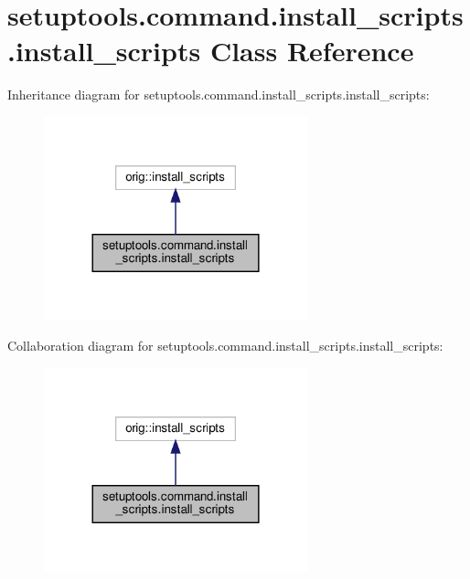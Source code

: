 \hypertarget{classsetuptools_1_1command_1_1install__scripts_1_1install__scripts}{}\section{setuptools.\+command.\+install\+\_\+scripts.\+install\+\_\+scripts Class Reference}
\label{classsetuptools_1_1command_1_1install__scripts_1_1install__scripts}


Inheritance diagram for setuptools.\+command.\+install\+\_\+scripts.\+install\+\_\+scripts\+:
\nopagebreak
\begin{figure}[H]
\begin{center}
\leavevmode
\includegraphics[width=216pt]{classsetuptools_1_1command_1_1install__scripts_1_1install__scripts__inherit__graph}
\end{center}
\end{figure}


Collaboration diagram for setuptools.\+command.\+install\+\_\+scripts.\+install\+\_\+scripts\+:
\nopagebreak
\begin{figure}[H]
\begin{center}
\leavevmode
\includegraphics[width=216pt]{classsetuptools_1_1command_1_1install__scripts_1_1install__scripts__coll__graph}
\end{center}
\end{figure}
